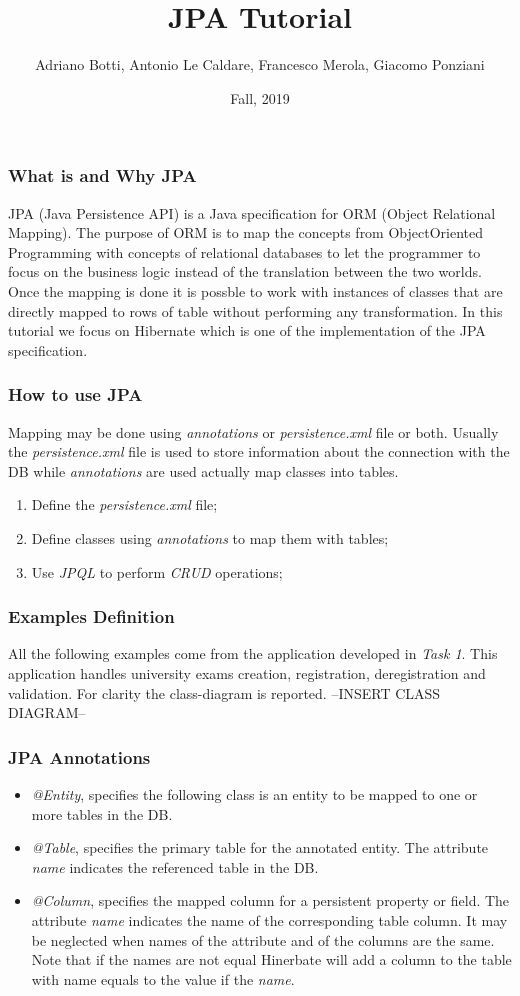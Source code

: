 \documentclass{beamer}
\title{JPA Tutorial}
\author{Adriano Botti, Antonio Le Caldare, Francesco Merola, Giacomo Ponziani}
\institute{Information Systems, University of Pisa}
\date{Fall, 2019}
\begin{document}
\frame{\titlepage}

\begin{frame}
\frametitle{What is and Why JPA}
JPA (Java Persistence API) is a Java specification for ORM (Object Relational Mapping). The purpose of ORM is to map the concepts from ObjectOriented Programming with concepts of relational databases to let the programmer to focus on the business logic instead of the translation between the two worlds. Once the mapping is done it is possble to work with instances of classes that are directly mapped to rows of table without performing any transformation.
In this tutorial we focus on Hibernate which is one of the implementation of the JPA specification. 
\end{frame}

\begin{frame}
\frametitle{How to use JPA}
Mapping may be done using \textit{annotations} or \textit{persistence.xml} file or both. Usually the \textit{persistence.xml} file is used to store information about the connection with the DB while \textit{annotations} are used actually map classes into tables.
\begin{enumerate}
\item Define the \textit{persistence.xml} file;
\item Define classes using \textit{annotations} to map them with tables;
\item Use \textit{JPQL} to perform \textit{CRUD} operations;
\end{enumerate}
\end{frame}

\begin{frame}
\frametitle{Examples Definition}
All the following examples come from the application developed in \textit{Task 1}. This application handles university exams creation, registration, deregistration and validation.
For clarity the class-diagram is reported.
\linebreak
\linebreak
--INSERT CLASS DIAGRAM--
\end{frame}

\begin{frame}
\frametitle{JPA Annotations}
\begin{itemize}
\item \textit{@Entity}, specifies the following class is an entity to be mapped to one or more tables in the DB.
\item \textit{@Table}, specifies the primary table for the annotated entity. The attribute \textit{name} indicates the referenced table in the DB.
\item \textit{@Column}, specifies the mapped column for a persistent property or field. The attribute \textit{name} indicates the name of the corresponding table column. It may be neglected when names of the attribute and of the columns are the same. \alert{Note} that if the names are not equal Hinerbate will add a column to the table with name equals to the value if the \textit{name}.
\end{itemize}

\end{frame}
\end{document}
